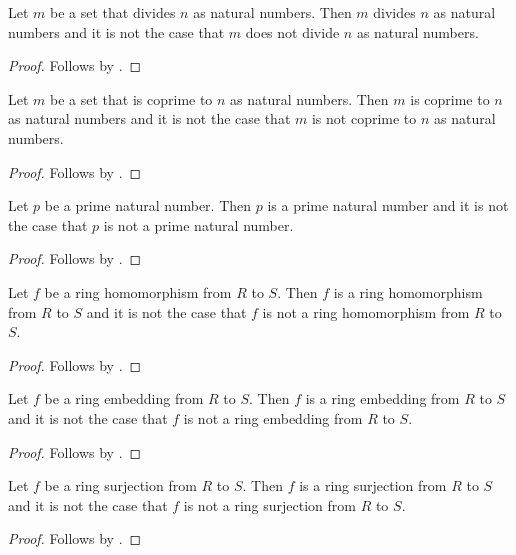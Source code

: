 \begin{proposition}\label{spike_use_natural_divisibility}
    Let $m$ be a set that divides $n$ as natural numbers.
    Then $m$ divides $n$ as natural numbers and it is not the case that
        $m$ does not divide $n$ as natural numbers.
\end{proposition}
\begin{proof} Follows by \auto. \end{proof}

\begin{proposition}\label{spike_use_coprime_naturals}
    Let $m$ be a set that is coprime to $n$ as natural numbers.
    Then $m$ is coprime to $n$ as natural numbers and it is not the case that
        $m$ is not coprime to $n$ as natural numbers.
\end{proposition}
\begin{proof} Follows by \auto. \end{proof}

\begin{proposition}\label{spike_use_prime_natural}
    Let $p$ be a prime natural number.
    Then $p$ is a prime natural number and it is not the case that
        $p$ is not a prime natural number.
\end{proposition}
\begin{proof} Follows by \auto. \end{proof}

\begin{proposition}\label{spike_use_ring_hom}
    Let $f$ be a ring homomorphism from $R$ to $S$.
    Then $f$ is a ring homomorphism from $R$ to $S$ and it is not the case
        that $f$ is not a ring homomorphism from $R$ to $S$.
\end{proposition}
\begin{proof} Follows by \auto. \end{proof}

\begin{proposition}\label{spike_use_ring_embedding}
    Let $f$ be a ring embedding from $R$ to $S$.
    Then $f$ is a ring embedding from $R$ to $S$ and it is not the case
        that $f$ is not a ring embedding from $R$ to $S$.
\end{proposition}
\begin{proof} Follows by \auto. \end{proof}

\begin{proposition}\label{spike_use_ring_surjection}
    Let $f$ be a ring surjection from $R$ to $S$.
    Then $f$ is a ring surjection from $R$ to $S$ and it is not the case
        that $f$ is not a ring surjection from $R$ to $S$.
\end{proposition}
\begin{proof} Follows by \auto. \end{proof}

